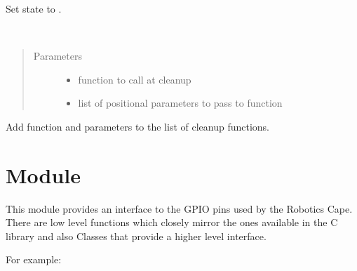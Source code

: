 \documentclass[letterpaper,10pt,english]{sphinxmanual}
\begin{document}

\begin{fulllineitems}
\label{\detokenize{index:rcpy.exit}}
Set state to {\hyperref[\detokenize{index:rcpy.EXITING}]{}}.

\end{fulllineitems}


\begin{fulllineitems}
\label{\detokenize{index:rcpy.add_cleanup}}~\begin{quote}\begin{description}
\item[{Parameters}] \leavevmode\begin{itemize}
\item {} 
 \textendash{} function to call at cleanup

\item {} 
 \textendash{} list of positional parameters to pass to function 

\end{itemize}

\end{description}\end{quote}

Add function  and parameters  to the list of cleanup functions.

\end{fulllineitems}



\chapter{Module }
\label{\detokenize{index:module-rcpy-gpio}}\label{\detokenize{index:rcpy-gpio}}\label{\detokenize{index:module-rcpy.gpio}}
This module provides an interface to the GPIO pins used by the
Robotics Cape. There are low level functions which closely mirror the
ones available in the C library and also Classes that provide a higher
level interface.

For example:
\end{document}
